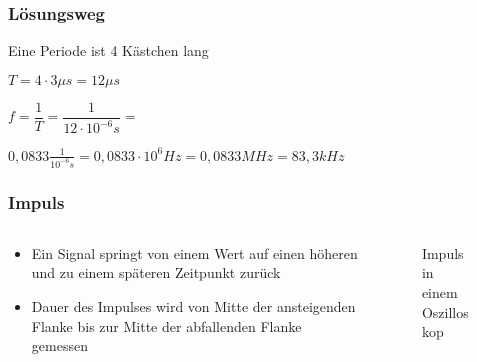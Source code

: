 \begin{frame}
\frametitle{Lösungsweg}
Eine Periode ist 4 Kästchen lang

$T = 4\cdot 3\mu s = 12\mu s$

$f = \dfrac{1}{T} = \dfrac{1}{12\cdot10^{-6}s} = $

$0,0833\frac{1}{10^{-6}s} = 0,0833\cdot10^6Hz = 0,0833MHz = 83,3kHz$

\end{frame}

\begin{frame}
\end{frame}

\begin{frame}
\frametitle{Impuls}
\begin{columns}
    \begin{column}{0.48\textwidth}
    \begin{itemize}
  \item Ein Signal springt von einem Wert auf einen höheren und zu einem späteren Zeitpunkt zurück
  \item Dauer des Impulses wird von Mitte der ansteigenden Flanke bis zur Mitte der abfallenden Flanke gemessen
  \end{itemize}

    \end{column}
   \begin{column}{0.48\textwidth}
       
\begin{figure}
    \caption{\scriptsize Impuls in einem Oszilloskop}
    \label{e_impuls}
\end{figure}

 
   \end{column}
\end{columns}

\end{frame}

